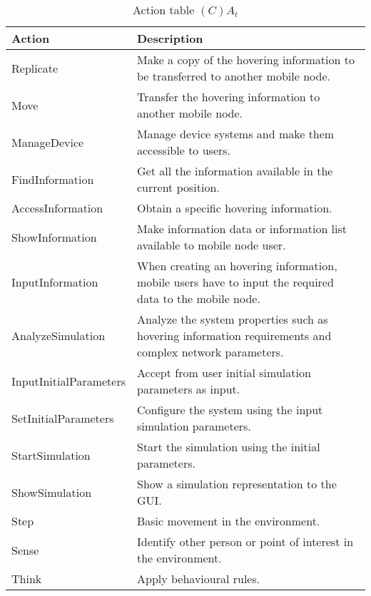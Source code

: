 \begin{table}[H]
	\centering
	\begin{tabular}{|p{4cm}|p{8cm}|}
			\hline
			\textbf{Action} & \textbf{Description} \\
			\hline
			Replicate & Make a copy of the hovering information to be transferred to
			another mobile node. \\
			\hline
			Move & Transfer the hovering information to another mobile node. \\
			\hline
			ManageDevice & Manage device systems and make them accessible to users. \\
			\hline
			FindInformation & Get all the information available in the current position.\\
			\hline
			AccessInformation & Obtain a specific hovering information. \\
			\hline
			ShowInformation & Make information data or information list available to
			mobile node user.\\
			\hline
			InputInformation & When creating an hovering information, mobile users have to
			input the required data to the mobile node. \\
			\hline
			AnalyzeSimulation & Analyze the system properties such as hovering
			information requirements and complex network parameters. \\
			\hline
			InputInitialParameters & Accept from user initial simulation parameters
			as input. \\
			\hline
			SetInitialParameters & Configure the system using the input simulation parameters. \\
			\hline
			StartSimulation & Start the simulation using the initial parameters. \\
			\hline
			ShowSimulation & Show a simulation representation to the GUI. \\
			\hline
			Step & Basic movement in the environment. \\
			\hline
			Sense & Identify other person or point of interest in the environment. \\
			\hline
			Think & Apply behavioural rules. \\
			\hline
		\end{tabular}
	\caption{Action table $(C)A_t$}
	\label{tab:cat}
\end{table}

